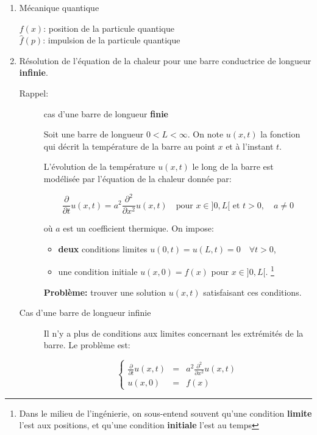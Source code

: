 \begin{enumerate}[label=\alph*)]
    
    \item
    Mécanique quantique
    
    $f(x)$: position de la particule quantique\\
    $\hat{f}(p)$: impulsion de la particule quantique
    
    
    \item
    Résolution de l'équation de la chaleur pour une barre conductrice de longueur \textbf{infinie}.
    
    \begin{description}
    \item[Rappel:] cas d'une barre de longueur \textbf{finie}
    
    Soit une barre de longueur $0 < L < \infty$.
    On note $u(x,t)$ la fonction qui décrit la température de la barre au point $x$ et à l'instant $t$.
    
    L'évolution de la température $u(x,t)$ le long de la barre est modélisée par l'équation de la chaleur donnée par:
    
    \[
    \frac{\partial}{\partial t} u(x,t) = a^2 \frac{\partial^2}{\partial x^2} u(x,t) \quad \textrm{pour } x \in ]0,L[ \textrm{ et } t > 0, \quad a \neq 0
    \]
    
    où $a$ est un coefficient thermique.
    On impose:
    \begin{itemize}
    \item \textbf{deux} conditions limites $u(0,t) = u(L,t) = 0 \quad \forall t > 0$,
    \item une condition initiale $u(x,0) = f(x)$ pour $x \in ]0,L[$. \footnote{Dans le milieu de l'ingénierie, on sous-entend souvent qu'une condition \textbf{limite} l'est aux positions, et qu'une condition \textbf{initiale} l'est au temps}
    \end{itemize} 

    \textbf{Problème:} trouver une solution $u(x,t)$ satisfaisant ces conditions.
    
    \item[Cas d'une barre de longueur infinie]\hfill
    
    Il n'y a plus de conditions aux limites concernant les extrémités de la barre.
    Le problème est:
    
    \[
    \left\{
    \begin{array}{rcl}
    \frac{\partial}{\partial t} u(x,t) &=& a^2 \frac{\partial^2}{\partial x^2} u(x,t)\\
    u(x,0) &=& f(x)
    \end{array}
    \right.
    \]
    

\end{description}
\end{enumerate}

